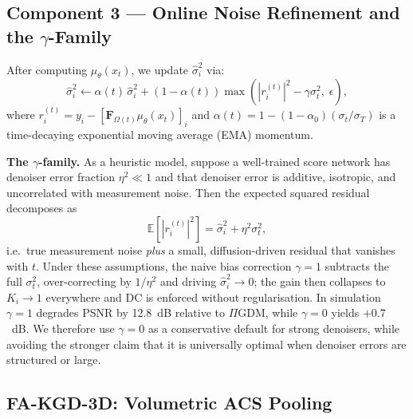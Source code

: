 \documentclass[10pt,twocolumn,letterpaper]{article}
\newcommand{\hatsig}{\hat{\sigma}}
\newcommand{\muth}{\mu_\theta}
\begin{document}
\subsection{\texorpdfstring{Component 3 — Online Noise Refinement and the $\gamma$-Family}{Component 3 — Online Noise Refinement and the gamma-Family}}

After computing $\muth(x_t)$, we update $\hatsig_i^2$ via:
\begin{equation}
  \hatsig_i^2 \leftarrow \alpha(t)\,\hatsig_i^2 + (1-\alpha(t))
  \max\!\left(|r_i^{(t)}|^2 - \gamma\sigma_t^2,\; \epsilon\right),
  \label{eq:mstep}
\end{equation}
where $r_i^{(t)} = y_i - [\mathbf{F}_{\Omega(t)}\muth(x_t)]_i$ and
$\alpha(t) = 1 - (1-\alpha_0)(\sigma_t / \sigma_T)$ is a time-decaying
exponential moving average (EMA) momentum.

\textbf{The $\gamma$-family.} As a heuristic model, suppose a well-trained
score network has denoiser error fraction $\eta^2\!\ll\!1$ and that denoiser
error is additive, isotropic, and uncorrelated with measurement noise. Then the
expected squared residual decomposes as
\begin{equation}
  \mathbb{E}\!\left[|r_i^{(t)}|^2\right] = \hatsig_i^2 + \eta^2\sigma_t^2 ,
  \label{eq:gamma_decomp}
\end{equation}
i.e.\ true measurement noise \emph{plus} a small, diffusion-driven residual
that vanishes with $t$. Under these assumptions, the naive bias correction
$\gamma{=}1$ subtracts the full $\sigma_t^2$, over-correcting by $1/\eta^2$ and driving
$\hatsig_i^2\!\to\!0$; the gain then collapses to $K_i\!\to\!1$ everywhere
and DC is enforced without regularisation. In simulation $\gamma{=}1$
degrades PSNR by 12.8~dB relative to $\Pi$GDM, while $\gamma{=}0$ yields
$+0.7$~dB. We therefore use $\gamma{=}0$ as a conservative default for strong
denoisers, while avoiding the stronger claim that it is universally optimal
when denoiser errors are structured or large.

\subsection{FA-KGD-3D: Volumetric ACS Pooling}
\label{sec:fakgd3d}
\end{document}
